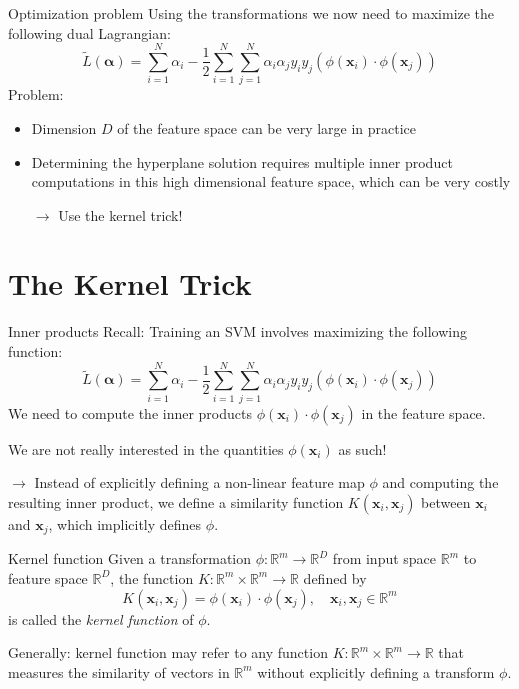 \documentclass[dvipsnames]{beamer}
\begin{document}
			\begin{frame}{Optimization problem}
        Using the transformations we now need to maximize the following dual Lagrangian:
			\[
			\widetilde{L}(\boldsymbol{\alpha}) = \sum_{i=1}^N\alpha_i - \frac{1}{2}\sum_{i=1}^N\sum_{j=1}^N\alpha_i\alpha_j y_i y_j (\phi(\mathbf{x}_i) \cdot \phi(\mathbf{x}_j))
			\]
			Problem: 
			\begin{itemize}
				\item Dimension $D$ of the feature space can be very large in practice %
				\item Determining the hyperplane solution requires multiple inner product computations in this high dimensional feature space, which can be very costly %
				\item[$\rightarrow$] Use the kernel trick!
			\end{itemize}
			\end{frame}
			
			\section{The Kernel Trick}
			\begin{frame}{Inner products}
        Recall: Training an SVM involves maximizing the following function:
			\[
			\widetilde{L}(\boldsymbol{\alpha}) = \sum_{i=1}^N\alpha_i - \frac{1}{2}\sum_{i=1}^N\sum_{j=1}^N\alpha_i\alpha_j y_i y_j (\phi(\mathbf{x}_i) \cdot \phi(\mathbf{x}_j))
			\]
			We need to compute the inner products $\phi(\mathbf{x}_i) \cdot \phi(\mathbf{x}_j)$ in the feature space. %
			
			We are not really interested in the quantities $\phi(\mathbf{x}_i)$ as such! %
			
			$\rightarrow$ Instead of explicitly defining a non-linear feature map $\phi$ and computing the resulting inner product, we define a similarity function $K(\mathbf{x}_i,\mathbf{x}_j) $ between $\mathbf{x}_i$ and $\mathbf{x}_j$, which implicitly defines $\phi$.
			\end{frame}
			
			\begin{frame}{Kernel function}
        Given a transformation $\phi:\mathbb{R}^m \rightarrow \mathbb{R}^{D}$ from input space $\mathbb{R}^m$ to feature space $\mathbb{R}^D$, the function $K:\mathbb{R}^m \times \mathbb{R}^m \rightarrow \mathbb{R}$ defined by
				\[
				K(\mathbf{x}_i,\mathbf{x}_j) = \phi(\mathbf{x}_i)\cdot \phi(\mathbf{x}_j),\quad \mathbf{x}_i,\mathbf{x}_j \in \mathbb{R}^{m}
				\]
				is called the \emph{kernel function} of $\phi$. %
				
				Generally: kernel function may refer to any function $K:\mathbb{R}^m \times \mathbb{R}^m \rightarrow \mathbb{R}$ that measures the similarity of vectors in $\mathbb{R}^m$ without explicitly defining a transform $\phi$.
			\end{frame}
			
\end{document}
